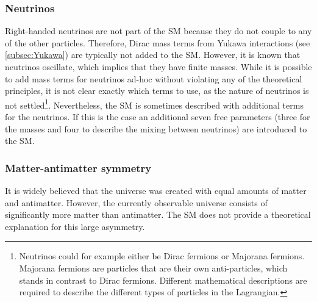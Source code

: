 \subsubsection{Neutrinos}
Right-handed neutrinos are not part of the SM because they do not couple to any of the other particles.
Therefore, Dirac mass terms from Yukawa interactions (see \cref{subsec:Yukawa}) are typically not added to the SM. 
However, it is known that neutrinos oscillate, which implies that they have finite masses.
While it is possible to add mass terms for neutrinos ad-hoc without violating any of the theoretical principles, it is not clear exactly which terms to use, as the nature of neutrinos is not settled\footnote{Neutrinos could for example either be Dirac fermions or Majorana fermions. Majorana fermions are particles that are their own anti-particles, which stands in contrast to Dirac fermions. Different mathematical descriptions are required to describe the different types of particles in the Lagrangian.}. 
Nevertheless, the SM is sometimes described with additional terms for the neutrinos. If this is the case an additional seven free parameters (three for the masses and four to describe the mixing between neutrinos) are introduced to the SM.


\subsubsection{Matter-antimatter symmetry}
It is widely believed that the universe was created with equal amounts of matter and antimatter.
However, the currently observable universe consists of significantly more matter than antimatter. 
The SM does not provide a theoretical explanation for this large asymmetry. 

